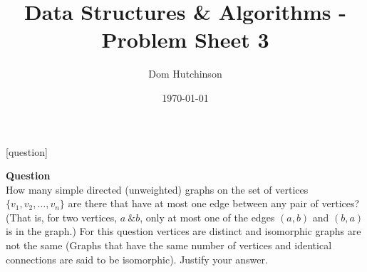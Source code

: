 \documentclass[11pt,a4paper]{article}
\begin{document}
\pagestyle{fancy}
\setlength\parindent{0pt}
\allowdisplaybreaks

[question]

\newcommand{\nats}{\mathbb{N}}
\newcommand{\real}{\mathbb{R}}
\newcommand{\newquestion} {\stepcounter{question}}
\newcommand{\newqpart} {\stepcounter{qpart}}
\newcommand{\question}[1] {\newquestion \ifquestions \textbf{Question \arabic{question}}\\ #1\\ \fi}
\newcommand{\Question}[1] {\newquestion \ifquestions \textbf{Question \arabic{question}}\\ #1 \fi}
\newcommand{\Qpart}[1] {\newquestion\newqpart \ifquestions \textbf{Question \arabic{question}.\arabic{qpart}}\\ #1\\ \fi}
\newcommand{\qpart}[1] {\newqpart \ifquestions \textbf{Question \arabic{question}.\arabic{qpart}}\\ #1\\ \fi}
\newcommand{\solution}[1] {\ifsolutions\textbf{My Solution \arabic{question}}\\ #1\\ \fi}
\newcommand{\Spart}[1] {\newqpart\ifsolutions\textbf{My Solution \arabic{question}.\arabic{qpart}}\\ #1\\ \fi}
\newcommand{\spart}[1] {\ifsolutions\textbf{My Solution \arabic{question}.\arabic{qpart}}\\ #1\\ \fi}
\newcommand{\doubleplus} {+\kern-1.3ex+\kern0.8ex}
\renewcommand{\headrulewidth}{0pt}

\newif\ifquestions
\questionstrue
\newif\ifsolutions
\solutionstrue

\title{Data Structures \& Algorithms - Problem Sheet 3}
\author{Dom Hutchinson}
\date{\today}
\maketitle

\fancyhead[R]{\today}

\question{
How many simple directed (unweighted) graphs on the set of vertices $\{v_1,v_2,\dots,v_n\}$ are there that have at most one edge between any pair of vertices?
(That is, for two vertices, $a\ \& b$, only at most one of the edges $(a,b)$ and $(b,a)$ is in the graph.) For this question vertices are distinct and isomorphic graphs are not the same (Graphs that have the same number of vertices and identical connections are said to be isomorphic). Justify your answer.
}
\end{document}
